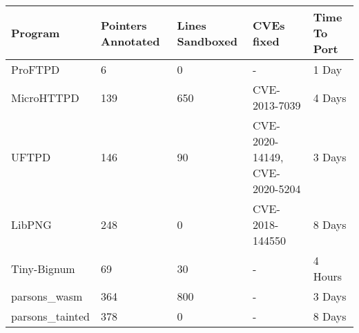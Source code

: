 \begin{center}
\begin{tabular}{||p{2 cm} | p{1.2cm} | p{1.2cm} | p{1.0cm} | p{1.0cm}||} 
 \hline
 Program & Pointers Annotated  & Lines Sandboxed & CVEs fixed & Time To Port \\ [0.5ex] 
 \hline\hline
 ProFTPD & 6 & 0 & - & 1 Day  \\
 \hline
 MicroHTTPD & 139 & 650 & CVE-2013-7039 & 4 Days \\
 \hline
 UFTPD & 146 & 90 & CVE-2020-14149, CVE-2020-5204 & 3 Days \\ 
 \hline
 LibPNG & 248 &  0 & CVE-2018-144550 & 8 Days \\
 \hline
 Tiny-Bignum &  69 &  30 & - & 4 Hours \\
 \hline
 parsons\_wasm & 364 & 800 &  - & 3 Days \\ 
 \hline
 parsons\_tainted & 378 & 0 & - & 8 Days \\ [1ex]
 \hline 
\end{tabular}
\end{center}
% 







